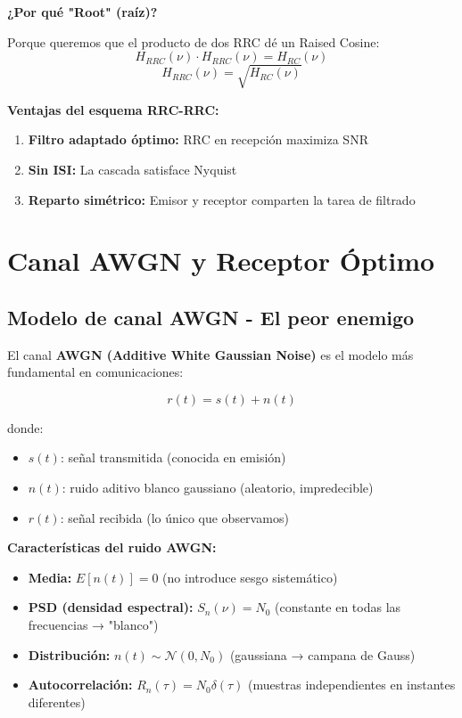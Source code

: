 \documentclass[10pt,a4paper]{article}
\begin{document}
\textbf{¿Por qué "Root" (raíz)?}

Porque queremos que el producto de dos RRC dé un Raised Cosine:
$$H_{RRC}(\nu) \cdot H_{RRC}(\nu) = H_{RC}(\nu)$$
$$H_{RRC}(\nu) = \sqrt{H_{RC}(\nu)}$$

\textbf{Ventajas del esquema RRC-RRC:}
\begin{enumerate}
\item \textbf{Filtro adaptado óptimo:} RRC en recepción maximiza SNR
\item \textbf{Sin ISI:} La cascada satisface Nyquist
\item \textbf{Reparto simétrico:} Emisor y receptor comparten la tarea de filtrado
\end{enumerate}

\section{Canal AWGN y Receptor Óptimo}

\subsection{Modelo de canal AWGN - El peor enemigo}

El canal \textbf{AWGN (Additive White Gaussian Noise)} es el modelo más fundamental en comunicaciones:

$$r(t) = s(t) + n(t)$$

donde:
\begin{itemize}
\item $s(t)$: señal transmitida (conocida en emisión)
\item $n(t)$: ruido aditivo blanco gaussiano (aleatorio, impredecible)
\item $r(t)$: señal recibida (lo único que observamos)
\end{itemize}

\textbf{Características del ruido AWGN:}
\begin{itemize}
\item \textbf{Media:} $E[n(t)] = 0$ (no introduce sesgo sistemático)
\item \textbf{PSD (densidad espectral):} $S_n(\nu) = N_0$ (constante en todas las frecuencias → "blanco")
\item \textbf{Distribución:} $n(t) \sim \mathcal{N}(0, N_0)$ (gaussiana → campana de Gauss)
\item \textbf{Autocorrelación:} $R_n(\tau) = N_0\delta(\tau)$ (muestras independientes en instantes diferentes)
\end{itemize}
\end{document}
